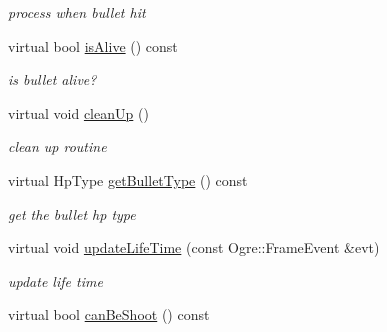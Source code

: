\begin{DoxyCompactItemize}
\begin{DoxyCompactList}\small\item\em process when bullet hit \end{DoxyCompactList}\item 
virtual bool \hyperlink{class_n_c_t_u_1_1_bullet_obstacle_a40e7d8af32475bc9520ead568771f64c}{is\+Alive} () const \hypertarget{class_n_c_t_u_1_1_bullet_obstacle_a40e7d8af32475bc9520ead568771f64c}{}\label{class_n_c_t_u_1_1_bullet_obstacle_a40e7d8af32475bc9520ead568771f64c}

\begin{DoxyCompactList}\small\item\em is bullet alive? \end{DoxyCompactList}\item 
virtual void \hyperlink{class_n_c_t_u_1_1_bullet_obstacle_a149609db8052addfcfebe2e24858fe20}{clean\+Up} ()\hypertarget{class_n_c_t_u_1_1_bullet_obstacle_a149609db8052addfcfebe2e24858fe20}{}\label{class_n_c_t_u_1_1_bullet_obstacle_a149609db8052addfcfebe2e24858fe20}

\begin{DoxyCompactList}\small\item\em clean up routine \end{DoxyCompactList}\item 
virtual Hp\+Type \hyperlink{class_n_c_t_u_1_1_bullet_obstacle_ad39ecce6671c5d1ea03ff5d017a7f475}{get\+Bullet\+Type} () const \hypertarget{class_n_c_t_u_1_1_bullet_obstacle_ad39ecce6671c5d1ea03ff5d017a7f475}{}\label{class_n_c_t_u_1_1_bullet_obstacle_ad39ecce6671c5d1ea03ff5d017a7f475}

\begin{DoxyCompactList}\small\item\em get the bullet hp type \end{DoxyCompactList}\item 
virtual void \hyperlink{class_n_c_t_u_1_1_bullet_obstacle_a749649fe487147408344fb4dfe3021cf}{update\+Life\+Time} (const Ogre\+::\+Frame\+Event \&evt)\hypertarget{class_n_c_t_u_1_1_bullet_obstacle_a749649fe487147408344fb4dfe3021cf}{}\label{class_n_c_t_u_1_1_bullet_obstacle_a749649fe487147408344fb4dfe3021cf}

\begin{DoxyCompactList}\small\item\em update life time \end{DoxyCompactList}\item 
virtual bool \hyperlink{class_n_c_t_u_1_1_bullet_obstacle_abf28165332c4599dad8a3b92cfb8fac8}{can\+Be\+Shoot} () const \hypertarget{class_n_c_t_u_1_1_bullet_obstacle_abf28165332c4599dad8a3b92cfb8fac8}{}\label{class_n_c_t_u_1_1_bullet_obstacle_abf28165332c4599dad8a3b92cfb8fac8}


\end{DoxyCompactItemize}
